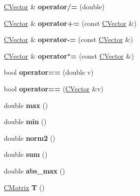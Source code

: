 \begin{DoxyCompactItemize}
\hyperlink{class_c_vector}{C\+Vector} \& {\bfseries operator/=} (double)
\item 
\mbox{\label{class_c_vector_a67d4d5c3af556f6dd22e7c5281bec641}} 
\hyperlink{class_c_vector}{C\+Vector} \& {\bfseries operator+=} (const \hyperlink{class_c_vector}{C\+Vector} \&)
\item 
\mbox{\label{class_c_vector_a8f92908b165eb3b79cae3b6219a968bb}} 
\hyperlink{class_c_vector}{C\+Vector} \& {\bfseries operator-\/=} (const \hyperlink{class_c_vector}{C\+Vector} \&)
\item 
\mbox{\label{class_c_vector_a2da6302e406d6d03a0643917ecf49e2d}} 
\hyperlink{class_c_vector}{C\+Vector} \& {\bfseries operator$\ast$=} (const \hyperlink{class_c_vector}{C\+Vector} \&)
\item 
\mbox{\label{class_c_vector_a646904cae352b6d484f59eb918efae8c}} 
bool {\bfseries operator==} (double v)
\item 
\mbox{\label{class_c_vector_a64bf0dbdd954b2ab7707bf04499486b1}} 
bool {\bfseries operator==} (\hyperlink{class_c_vector}{C\+Vector} \&v)
\item 
\mbox{\label{class_c_vector_a09da5b95ccb0383ea05cbbd0ad2ac123}} 
double {\bfseries max} ()
\item 
\mbox{\label{class_c_vector_a30c34d982b01ca53d0b964a0c9a797ee}} 
double {\bfseries min} ()
\item 
\mbox{\label{class_c_vector_a95a5c133514a9a543685caf94f96373b}} 
double {\bfseries norm2} ()
\item 
\mbox{\label{class_c_vector_a636e4af7800e1d040cfc26fb85c90c19}} 
double {\bfseries sum} ()
\item 
\mbox{\label{class_c_vector_a8ec4cb4e10741b55b9ebac681c3cda6a}} 
double {\bfseries abs\+\_\+max} ()
\item 
\mbox{\label{class_c_vector_ad55ddbe508f050b6049b5ce606e50703}} 
\hyperlink{class_c_matrix}{C\+Matrix} {\bfseries T} ()

\end{DoxyCompactItemize}
